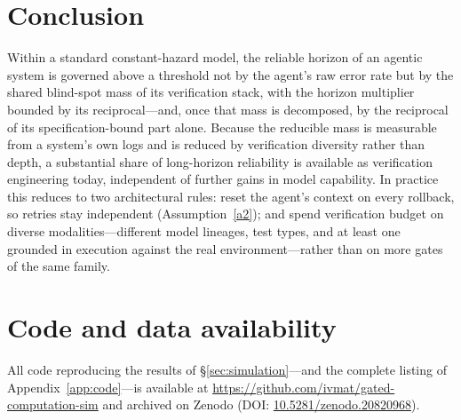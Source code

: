 \documentclass[11pt]{article}
\theoremstyle{remark}
\begin{document}
\section{Conclusion}
Within a standard constant-hazard model, the reliable horizon of an agentic system is governed
above a threshold not by the agent's raw error rate but by the shared blind-spot mass of its
verification stack, with the horizon multiplier bounded by its reciprocal---and, once that mass is
decomposed, by the reciprocal of its specification-bound part alone.
Because the reducible mass is
measurable from a system's own logs and is reduced by verification diversity rather than depth, a
substantial share of long-horizon reliability is available as verification engineering today,
independent of further gains in model capability.
In practice this reduces to two architectural rules: reset the agent's context on every rollback,
so retries stay independent (Assumption~\ref{a2}); and spend verification budget on diverse
modalities---different model lineages, test types, and at least one grounded in execution against
the real environment---rather than on more gates of the same family.

\section*{Code and data availability}
All code reproducing the results of \S\ref{sec:simulation}---and the complete listing of
Appendix~\ref{app:code}---is available at \url{https://github.com/ivmat/gated-computation-sim} and
archived on Zenodo (DOI: \href{https://doi.org/10.5281/zenodo.20820968}{10.5281/zenodo.20820968}).
\end{document}
